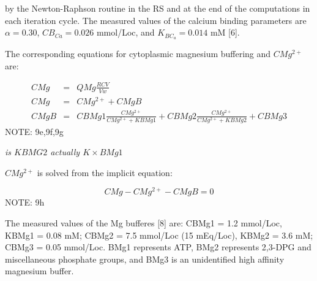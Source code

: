 \documentclass[a4paper]{article}
\newcommand{\cell}[1]{C#1}
\newcommand{\KBCa}{K_{{BC}_a}}
\newcommand{\CMgtp}{\cell{Mg^{2+}}}
\newcommand{\CBCa}{\cell{B_{Ca}}}
\newcommand{\CMgB}{\cell{MgB}}
\newcommand{\CMg}{\cell{Mg}}
\begin{document}
by the Newton-Raphson routine in the RS and at the end of the computations in each iteration cycle.  The measured values of the calcium binding parameters are $\alpha = 0.30$, $\CBCa = 0.026$ mmol/Loc, and $\KBCa = 0.014$ mM [6].

The corresponding equations for cytoplasmic magnesium buffering and $CMg^{2+}$ are:

\begin{eqnarray}
\CMg &=& QMg\frac{RCV}{Vw}\\
\CMg &=& \CMgtp + \CMgB\\
\CMgB &=& CBMg1\frac{\CMgtp}{\CMgtp+KBMg1}+CBMg2\frac{\CMgtp}{\CMgtp+KBMg2}+CBMg3
\end{eqnarray}
NOTE: 9e,9f,9g

\emph{is $KBMG2$ actually $K \times BMg1$}

$\CMgtp$ is solved from the implicit equation: 

\begin{equation}
\CMg - \CMgtp - \CMgB = 0
\end{equation}
NOTE: 9h


The measured values of the Mg bufferes [8] are: CBMg1 = 1.2 mmol/Loc, KBMg1 = 0.08 mM; CBMg2 = 7.5 mmol/Loc (15 mEq/Loc), KBMg2 = 3.6 mM; CBMg3 = 0.05 mmol/Loc. BMg1 represents ATP, BMg2 represents 2,3-DPG and miscellaneous phosphate groups, and BMg3 is an unidentified high affinity magnesium buffer.  
\end{document}
